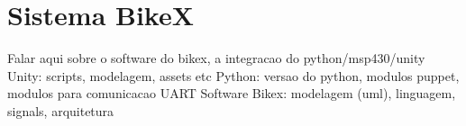 \section{Sistema BikeX}
\label{sec:sistema_bikex}

Falar aqui sobre o software do bikex, a integracao do python/msp430/unity
Unity: scripts, modelagem, assets etc
Python: versao do python, modulos puppet, modulos para comunicacao UART
Software Bikex: modelagem (uml), linguagem, signals, arquitetura